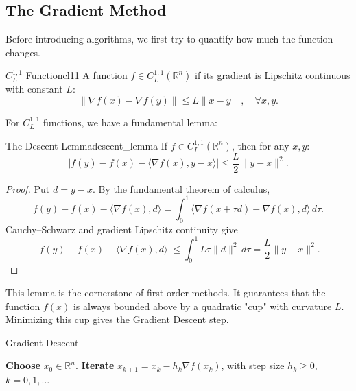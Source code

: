 \documentclass[11pt]{article}
\begin{document}
\subsection{The Gradient Method}
Before introducing algorithms, we first try to quantify how much the function changes.
\begin{definition}{$C_L^{1,1}$ Function}{cl11}
    A function $f \in C_L^{1,1}(\mathbb{R}^n)$ if its gradient is Lipschitz continuous with constant $L$:
    \[ \|\nabla f(x) - \nabla f(y)\| \le L \|x-y\|, \quad \forall x, y. \]
\end{definition}
For $C_L^{1,1}$ functions, we have a fundamental lemma:
\begin{lemma}{The Descent Lemma}{descent_lemma}
    If $f \in C_L^{1,1}(\mathbb{R}^n)$, then for any $x, y$:
    \[ |f(y) - f(x) - \langle \nabla f(x), y-x \rangle| \le \frac{L}{2}\|y-x\|^2. \]
\end{lemma}

\begin{proof}
Put $d=y-x$. By the fundamental theorem of calculus,
\[
f(y)-f(x)-\langle\nabla f(x),d\rangle
=\int_0^1\langle\nabla f(x+\tau d)-\nabla f(x),d\rangle\,d\tau.
\]
Cauchy--Schwarz and gradient Lipschitz continuity give
\[
\left|f(y)-f(x)-\langle\nabla f(x),d\rangle\right|
\le\int_0^1L\tau\|d\|^2\,d\tau
=\frac L2\|y-x\|^2.
\]
\end{proof}
\noindent This lemma is the cornerstone of first-order methods. It guarantees that the function $f(x)$ is always bounded above by a quadratic "cup" with curvature $L$. Minimizing this cup gives the Gradient Descent step.

\begin{algobox}{Gradient Descent}
\begin{algorithmic}[1]
    \State \textbf{Choose} $x_0\in\mathbb{R}^n$.
    \State \textbf{Iterate} $x_{k+1} = x_k - h_k \nabla f(x_k)$, with step size $h_k\geq0$, $k=0,1,\dots$
\end{algorithmic}
\end{algobox}
\end{document}
